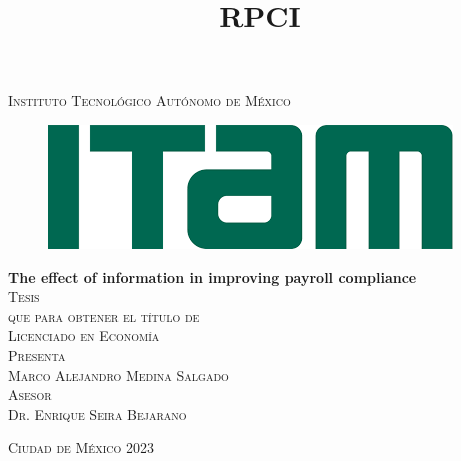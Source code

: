 \documentclass[oneside,11pt]{article}
\begin{document}

\begin{titlepage}
\begin{center}

\title{RPCI}

\textsc{\Large Instituto Tecnológico Autónomo de México}\\[2em]

\begin{figure}[h]
\begin{center}
\includegraphics[scale=0.50]{04_Figures/itam_logo.png}
\end{center}
\end{figure}


\textbf{\LARGE The effect of information in improving payroll compliance}\\[2em]

\textsc{\large Tesis}\\[1em]

\textsc{\large que para obtener el título de}\\[1em]

\textsc{\LARGE Licenciado en Economía}\\[1em]

\textsc{\large Presenta}\\[1em]

\textsc{\LARGE Marco Alejandro Medina Salgado}\\[1em]

\textsc{\large Asesor}\\[1em]

\textsc{\LARGE Dr. Enrique Seira Bejarano}\\[2em]


\end{center}

\vspace*{\fill}
\textsc{Ciudad de México \hspace*{\fill} 2023}

\end{titlepage}
\end{document}
